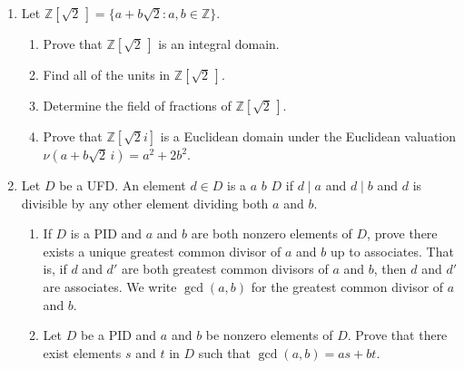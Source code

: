 {\begin{enumerate}
\begin{enumerate}
\end{enumerate}

 





 
 
 
\item
Let ${\mathbb Z}[ \sqrt{2}\, ] = \{ a + b \sqrt{2} : a, b \in {\mathbb Z} \}$. 
\begin{enumerate}

 \item
Prove that ${\mathbb Z}[ \sqrt{2}\, ]$ is an integral domain. 

 \item
Find all of the units in ${\mathbb Z}[\sqrt{2}\, ]$. 

 \item
Determine the field of fractions of ${\mathbb Z}[ \sqrt{2}\, ]$. 
 
 \item
Prove that  ${\mathbb Z}[ \sqrt{2} i ]$ is a Euclidean domain under the
Euclidean valuation $\nu( a + b \sqrt{2}\, i) = a^2 + 2b^2$. 
 
\end{enumerate}


\item
Let $D$ be a UFD. An element $d \in D$ is a  $a$
 $b$  $D$ if $d \mid a$ and $d \mid b$ and $d$ is
divisible by any other element dividing both $a$ and $b$.  
\begin{enumerate}

 \item
If $D$ is a PID and $a$ and $b$ are both nonzero elements of $D$,
prove there exists a unique greatest common divisor of $a$ and $b$ up to associates. That is, if $d$ and $d'$ are both greatest common divisors of $a$ and $b$, then $d$ and $d'$ are associates.  We write $\gcd( a, b)$ for the greatest common divisor of $a$ and $b$. 


 \item
Let $D$ be a PID and $a$ and $b$ be nonzero elements of $D$. Prove
that there exist elements $s$ and $t$ in $D$ such that $\gcd(a, b) =
as + bt$.

\end{enumerate}



\end{enumerate}}
